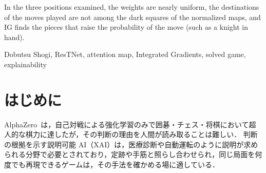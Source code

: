 \documentclass[submit]{ipsj}
\begin{document}
\begin{eabstract}
In the three positions examined, the weights are nearly uniform, the destinations of the moves played are not among the dark squares of the normalized maps,
and IG finds the pieces that raise the probability of the move (such as a knight in hand).
\end{eabstract}

\begin{ekeyword}
Dobutsu Shogi, ResTNet, attention map, Integrated Gradients, solved game, explainability
\end{ekeyword}

\maketitle
\thispagestyle{empty}

\section{はじめに}
AlphaZero~\cite{alphazero}は，自己対戦による強化学習のみで囲碁・チェス・将棋において超人的な棋力に達したが，その判断の理由を人間が読み取ることは難しい．
判断の根拠を示す説明可能 AI（XAI）は，医療診断や自動運転のように説明が求められる分野で必要とされており，定跡や手筋と照らし合わせられ，同じ局面を何度でも再現できるゲームは，その手法を確かめる場に適している．
\end{document}
